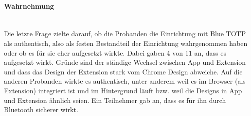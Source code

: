 \paragraph*{Wahrnehmung}
\mbox{} \vspace{0.1cm} \\
Die letzte Frage zielte darauf, ob die Probanden die Einrichtung mit Blue TOTP 
als authentisch, also als festen Bestandteil der Einrichtung wahrgenommen haben 
oder ob es für sie eher aufgesetzt wirkte. Dabei gaben 4 von 11 an, dass es 
aufgesetzt wirkt. Gründe sind der ständige Wechsel zwischen App und Extension 
und dass das Design der Extension stark vom Chrome Design abweiche. Auf die 
anderen Probanden wirkte es authentisch, unter anderem weil es im Browser (als 
Extension) integriert ist und im Hintergrund läuft bzw. weil die Designs in App 
und Extension ähnlich seien. Ein Teilnehmer gab an, dass es für ihn durch 
Bluetooth sicherer wirkt.